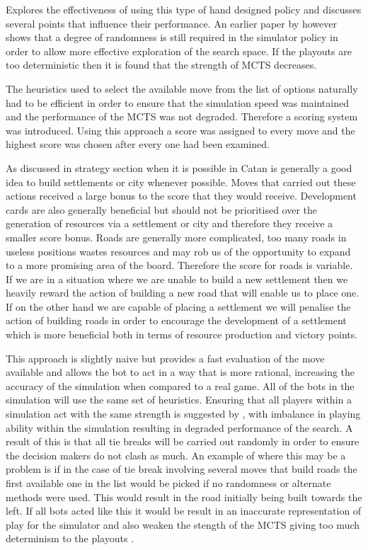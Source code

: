 \documentclass[]{article}
\begin{document}
\par \textcite{silver2009monte} Explores the effectiveness of using this type of hand designed policy and discusses several points that influence their performance. An earlier paper by \textcite{silver2007reinforcement} however shows that a degree of randomness is still required in the simulator policy in order to allow more effective exploration of the search space. If the playouts are too deterministic then it is found that the strength of MCTS decreases. 

\par The heuristics used to select the available move from the list of options naturally had to be efficient in order to ensure that the simulation speed was maintained and the performance of the MCTS was not degraded. Therefore a scoring system was introduced. Using this approach a score was assigned to every move and the highest score was chosen after every one had been examined. 

\par As discussed in strategy section when it is possible in Catan is generally a good idea to build settlements or city whenever possible. Moves that carried out these actions received a large bonus to the score that they would receive. Development cards are also generally beneficial but should not be prioritised over the generation of resources via a settlement or city and therefore they receive a smaller score bonus. Roads are generally more complicated, too many roads in useless positions wastes resources and may rob us of the opportunity to expand to a more promising area of the board. Therefore the score for roads is variable. If we are in a situation where we are unable to build a new settlement then we heavily reward the action of building a new road that will enable us to place one. If on the other hand we are capable of placing a settlement we will penalise the action of building roads in order to encourage the development of a settlement which is more beneficial both in terms of resource production and victory points.

\par This approach is slightly naive but provides a fast evaluation of the move available and allows the bot to act in a way that is more rational, increasing the accuracy of the simulation when compared to a real game. All of the bots in the simulation will use the same set of heuristics. Ensuring that all players within a simulation act with the same strength is suggested by \textcite{gelly2006modification}, with imbalance in playing ability within the simulation resulting in degraded performance of the search. A result of this is that all tie breaks will be carried out randomly in order to ensure the decision makers do not clash as much. An example of where this may be a problem is if in the case of tie break involving several moves that build roads the first available one in the list would be picked if no randomness or alternate methods were used. This would result in the road initially being built towards the left. If all bots acted like this it would be result in an inaccurate representation of play for the simulator and also weaken the stength of the MCTS giving too much determinism to the playouts \autocite{silver2007reinforcement}.   
\end{document}
